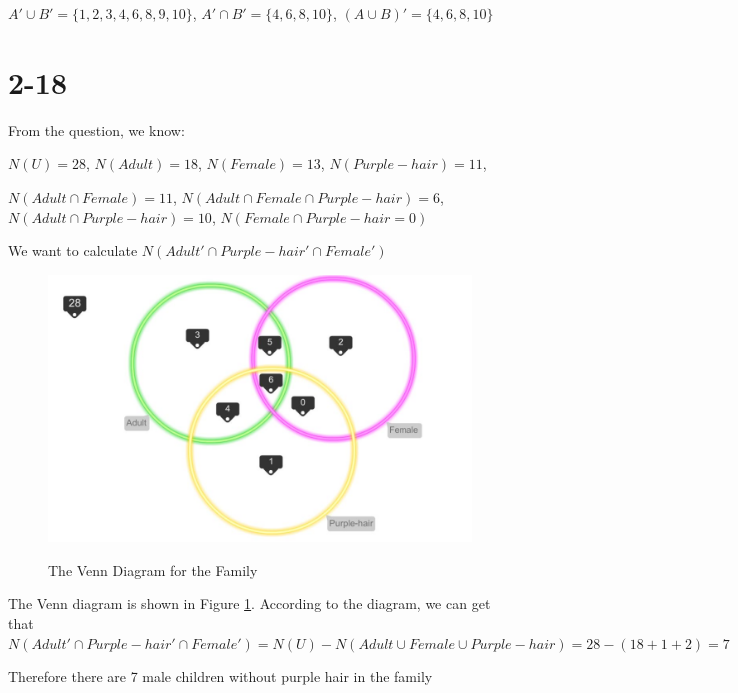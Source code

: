 \documentclass[12pt]{article}
\begin{document}
\begin{spacing}{2.0}
$A' \cup B'= \{1,2,3,4,6,8,9,10\}$, $A' \cap B'= \{4,6,8,10\}$, $(A\cup B)'= \{4,6,8,10\}$

\section*{2-18}
From the question, we know:

$N(U)=28$, $N(Adult)=18$, $N(Female)=13$, $N(Purple-hair)=11$,

$N(Adult\cap Female)=11$, $N(Adult\cap Female \cap Purple-hair)=6$, $N(Adult\cap Purple-hair)= 10$, $N(Female\cap Purple-hair=0)$

We want to calculate $N(Adult'\cap Purple-hair' \cap Female')$

\begin{figure}
  \centering
  \includegraphics[width=6in]{venn}\\
  \caption{The Venn Diagram for the Family}\label{venn}
\end{figure}

The Venn diagram is shown in Figure \ref{venn}. According to the diagram, we can get that $N(Adult'\cap Purple-hair' \cap Female')= N(U)- N(Adult\cup Female\cup Purple-hair)= 28-(18+1+2)=7$

Therefore there are 7 male children without purple hair in the family

\end{spacing}
\end{document}
